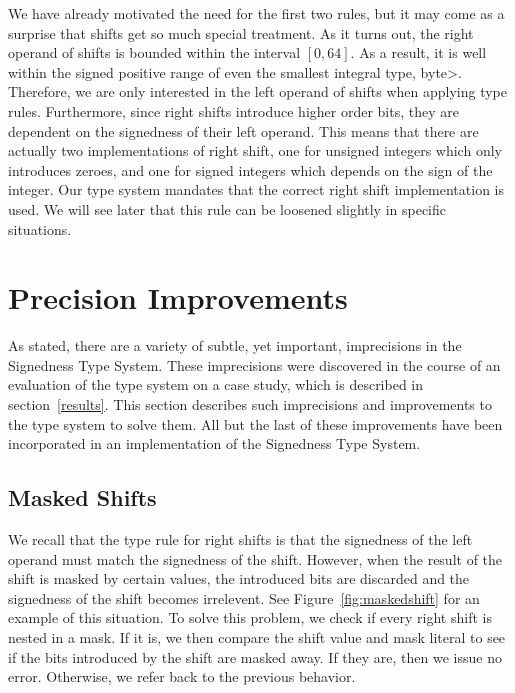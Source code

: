 We have already motivated the need for the first two rules, but it may come
as a surprise that shifts get so much special treatment. As it turns out,
the right operand of shifts is bounded within the interval $[0, 64]$. As a
result, it is well within the signed positive range of even the smallest
integral type, \<byte>. Therefore, we are only interested in the left operand
of shifts when applying type rules. Furthermore, since right shifts introduce
higher order bits, they are dependent on the signedness of their left operand.
This means that there are actually two implementations of right shift, one for
unsigned integers which only introduces zeroes, and one for signed integers
which depends on the sign of the integer. Our type system mandates that
the correct right shift implementation is used. We will see later that this
rule can be loosened slightly in specific situations.

\newpage
\section{Precision Improvements} \label{precision}

As stated, there are a variety of subtle, yet important, imprecisions in the
Signedness Type System. These imprecisions were discovered in the course of
an evaluation of the type system on a case study, which is described in
section~\ref{results}. This section describes such imprecisions and improvements
to the type system to solve them. All but the last of these improvements have
been incorporated in an implementation of the Signedness Type System.

\subsection{Masked Shifts}
We recall that the type rule for right shifts is that the signedness of the left
operand must match the signedness of the shift. However, when the result of the
shift is masked by certain values, the introduced bits are discarded and the
signedness of the shift becomes irrelevent. See Figure~\ref{fig:maskedshift}
for an example of this situation. To solve this problem, we check if every
right shift is nested in a mask. If it is, we then compare the shift value
and mask literal to see if the bits introduced by the shift are masked away.
If they are, then we issue no error. Otherwise, we refer back to the previous
behavior.

